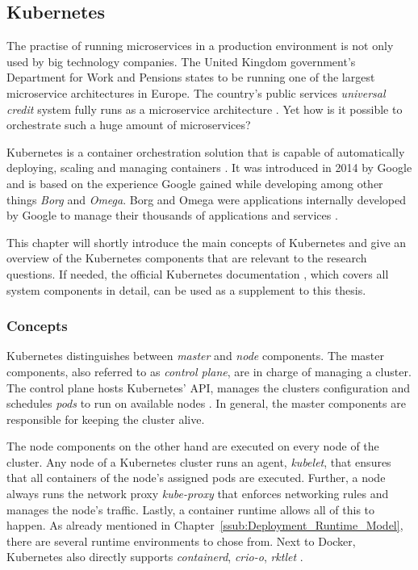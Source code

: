 
\subsection{Kubernetes}%
\label{sub:Kubernetes}

The practise of running microservices in a production environment is not only
used by big technology companies. The United Kingdom government's Department
for Work and Pensions states to be running one of the largest microservice
architectures in Europe. The country's public services \textit{universal
credit} system fully runs as a microservice architecture
\autocite{LoweLeadingwaymicroservices2016}. Yet how is it possible to
orchestrate such a huge amount of microservices?

Kubernetes is a container orchestration solution that is capable of
automatically deploying, scaling and managing containers
\autocite{AuthorsProductionGradeContainer}. It was introduced in 2014 by Google
and is based on the experience Google gained while developing among other
things \textit{Borg} and \textit{Omega}. Borg and Omega were applications
internally developed by Google to manage their thousands of applications and
services \autocite{LuksaKubernetesAction2017}.

This chapter will shortly introduce the main concepts of Kubernetes and give an
overview of the Kubernetes components that are relevant to the research
questions. If needed, the official Kubernetes documentation
\autocite{AuthorsProductionGradeContainer}, which covers all system components
in detail, can be used as a supplement to this thesis.

\subsubsection{Concepts}%
\label{ssub:Concepts}
Kubernetes distinguishes between \textit{master} and \textit{node} components.
The master components, also referred to as \textit{control plane}, are in
charge of managing a cluster. The control plane hosts Kubernetes' API, manages
the clusters configuration and schedules \textit{pods} to run on available
nodes \autocite{AuthorsKubernetesComponents2019}. In general, the master
components are responsible for keeping the cluster alive.

The node components on the other hand are executed on every node of the
cluster. Any node of a Kubernetes cluster runs an agent, \textit{kubelet}, that
ensures that all containers of the node's assigned pods are executed. Further,
a node always runs the network proxy \textit{kube-proxy} that enforces
networking rules and manages the node's traffic. Lastly, a container runtime
allows all of this to happen. As already mentioned in
Chapter~\ref{ssub:Deployment_Runtime_Model}, there are several runtime
environments to chose from. Next to Docker, Kubernetes also directly supports
\textit{containerd}, \textit{crio-o}, \textit{rktlet}
\autocite{AuthorsKubernetesComponents2019}.

